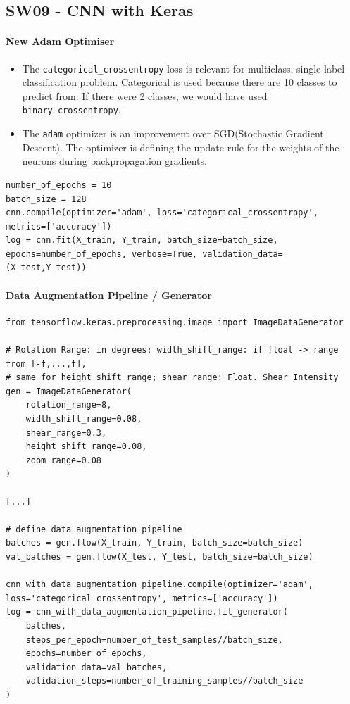 \documentclass[11pt]{article}
\begin{document}
\subsection{SW09 - CNN with Keras}
\paragraph{New Adam Optimiser}

\begin{itemize}
	\item The \texttt{categorical_crossentropy} loss is relevant for multiclass, single-label classification problem. Categorical is used because there are 10 classes to predict from. If there were 2 classes, we would have used \texttt{binary_crossentropy}.
	\item The \texttt{adam} optimizer is an improvement over SGD(Stochastic Gradient Descent). The optimizer is defining the update rule for the weights of the neurons during backpropagation gradients.
\end{itemize}

\begin{verbatim}
number_of_epochs = 10
batch_size = 128
cnn.compile(optimizer='adam', loss='categorical_crossentropy', metrics=['accuracy'])
log = cnn.fit(X_train, Y_train, batch_size=batch_size,
epochs=number_of_epochs, verbose=True, validation_data=(X_test,Y_test))
\end{verbatim}

\paragraph{Data Augmentation Pipeline / Generator}
\begin{verbatim}
from tensorflow.keras.preprocessing.image import ImageDataGenerator

# Rotation Range: in degrees; width_shift_range: if float -> range from [-f,...,f],
# same for height_shift_range; shear_range: Float. Shear Intensity
gen = ImageDataGenerator(
	rotation_range=8,
	width_shift_range=0.08,
	shear_range=0.3,
	height_shift_range=0.08,
	zoom_range=0.08
)

[...]

# define data augmentation pipeline
batches = gen.flow(X_train, Y_train, batch_size=batch_size)
val_batches = gen.flow(X_test, Y_test, batch_size=batch_size)

cnn_with_data_augmentation_pipeline.compile(optimizer='adam', loss='categorical_crossentropy', metrics=['accuracy'])
log = cnn_with_data_augmentation_pipeline.fit_generator(
	batches,
	steps_per_epoch=number_of_test_samples//batch_size,
	epochs=number_of_epochs,
	validation_data=val_batches,
	validation_steps=number_of_training_samples//batch_size
)
\end{verbatim}
\end{document}
